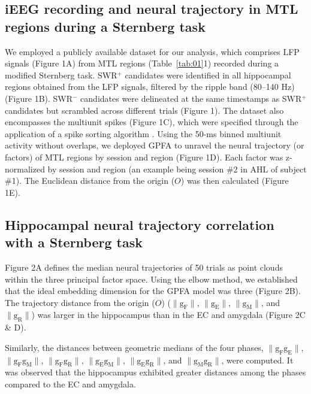 \documentclass[final,3p,times,twocolumn]{elsarticle}
\begin{document}
\subsection{iEEG recording and neural trajectory in MTL regions during a Sternberg task}
We employed a publicly available dataset \cite{boran_dataset_2020} for our analysis, which comprises LFP signals (Figure 1A) from MTL regions (Table~\ref{tab:01}1) recorded during a modified Sternberg task. SWR$^+$ candidates were identified in all hippocampal regions obtained from the LFP signals, filtered by the ripple band (80--140 Hz) (Figure 1B). SWR$^-$ candidates were delineated at the same timestamps as SWR$^+$ candidates but scrambled across different trials (Figure 1). The dataset also encompasses the multiunit spikes (Figure 1C), which were specified through the application of a spike sorting algorithm \cite{niediek_reliable_2016}. Using the 50-ms binned multiunit activity without overlaps, we deployed GPFA \cite{yu_gaussian-process_2009} to unravel the neural trajectory (or factors) of MTL regions by session and region (Figure 1D). Each factor was z-normalized by session and region (an example being session \#2 in AHL of subject \#1). The Euclidean distance from the origin ($O$) was then calculated (Figure 1E).

\subsection{Hippocampal neural trajectory correlation with a Sternberg task}
Figure 2A defines the median neural trajectories of 50 trials as point clouds within the three principal factor space. Using the elbow method, we established that the ideal embedding dimension for the GPFA model was three (Figure 2B). The trajectory distance from the origin ($O$) ($\mathrm{\lVert g_{F} \rVert}$, $\mathrm{\lVert g_{E} \rVert}$, $\mathrm{\lVert g_{M} \rVert}$, and $\mathrm{\lVert g_{R} \rVert}$) was larger in the hippocampus than in the EC and amygdala (Figure 2C \& D).

Similarly, the distances between geometric medians of the four phases, $\mathrm{\lVert g_{F}g_{E} \rVert}$, $\mathrm{\lVert g_{F}g_{M} \rVert}$, $\mathrm{\lVert g_{F}g_{R} \rVert}$, $\mathrm{\lVert g_{E}g_{M} \rVert}$, $\mathrm{\lVert g_{E}g_{R} \rVert}$, and $\mathrm{\lVert g_{M}g_{R} \rVert}$, were computed. It was observed that the hippocampus exhibited greater distances among the phases compared to the EC and amygdala. 
\end{document}
